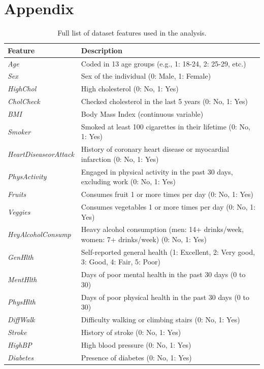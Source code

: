 \documentclass[a4paper,12pt]{article}
\begin{document}
\clearpage

\appendix
\section*{Appendix}

\begin{table}[h!]
    \centering
    \begin{tabularx}{\textwidth}{|l|X|}
    \hline
    \textbf{Feature} & \textbf{Description} \\ \hline
    \textit{Age} & Coded in 13 age groups (e.g., 1: 18-24, 2: 25-29, etc.) \\ \hline
    \textit{Sex} & Sex of the individual (0: Male, 1: Female) \\ \hline
    \textit{HighChol} & High cholesterol (0: No, 1: Yes) \\ \hline
    \textit{CholCheck} & Checked cholesterol in the last 5 years (0: No, 1: Yes) \\ \hline
    \textit{BMI} & Body Mass Index (continuous variable) \\ \hline
    \textit{Smoker} & Smoked at least 100 cigarettes in their lifetime (0: No, 1: Yes) \\ \hline
    \textit{HeartDiseaseorAttack} & History of coronary heart disease or myocardial infarction (0: No, 1: Yes) \\ \hline
    \textit{PhysActivity} & Engaged in physical activity in the past 30 days, excluding work (0: No, 1: Yes) \\ \hline
    \textit{Fruits} & Consumes fruit 1 or more times per day (0: No, 1: Yes) \\ \hline
    \textit{Veggies} & Consumes vegetables 1 or more times per day (0: No, 1: Yes) \\ \hline
    \textit{HvyAlcoholConsump} & Heavy alcohol consumption (men: 14+ drinks/week, women: 7+ drinks/week) (0: No, 1: Yes) \\ \hline
    \textit{GenHlth} & Self-reported general health (1: Excellent, 2: Very good, 3: Good, 4: Fair, 5: Poor) \\ \hline
    \textit{MentHlth} & Days of poor mental health in the past 30 days (0 to 30) \\ \hline
    \textit{PhysHlth} & Days of poor physical health in the past 30 days (0 to 30) \\ \hline
    \textit{DiffWalk} & Difficulty walking or climbing stairs (0: No, 1: Yes) \\ \hline
    \textit{Stroke} & History of stroke (0: No, 1: Yes) \\ \hline
    \textit{HighBP} & High blood pressure (0: No, 1: Yes) \\ \hline
    \textit{Diabetes} & Presence of diabetes (0: No, 1: Yes) \\ \hline
    \end{tabularx}
    \caption{Full list of dataset features used in the analysis.}
    \label{tab:feature_list}
\end{table}

\printbibliography
\end{document}
